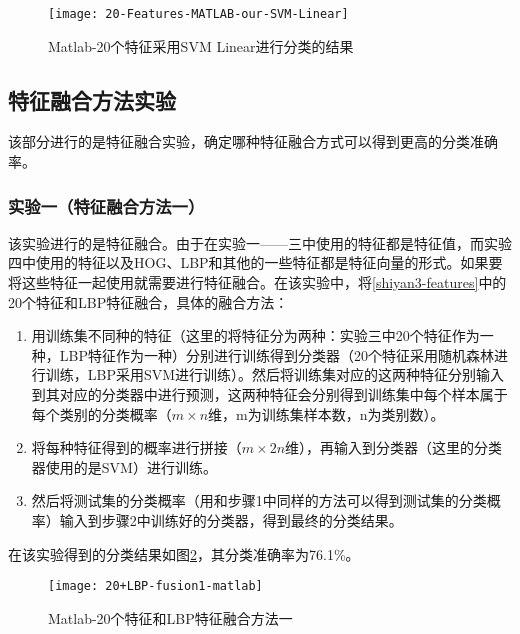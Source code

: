 \begin{figure}[!ht]
\centering
\texttt{[image: 20-Features-MATLAB-our-SVM-Linear]}
\caption{Matlab-20个特征采用SVM Linear进行分类的结果}
\label{fig:20-Features-MATLAB-our-SVM-Linear}
\end{figure}


\subsection{特征融合方法实验}
该部分进行的是特征融合实验，确定哪种特征融合方式可以得到更高的分类准确率。

\subsubsection{实验一（特征融合方法一）}
\label{ronghe1}
该实验进行的是特征融合。由于在实验一——三中使用的特征都是特征值，而实验四中使用的特征以及HOG、LBP和其他的一些特征都是特征向量的形式。如果要将这些特征一起使用就需要进行特征融合。在该实验中，将\ref{shiyan3-features}中的20个特征和LBP特征融合，具体的融合方法：
\begin{enumerate}
\item 用训练集不同种的特征（这里的将特征分为两种：实验三中20个特征作为一种，LBP特征作为一种）分别进行训练得到分类器（20个特征采用随机森林进行训练，LBP采用SVM进行训练）。然后将训练集对应的这两种特征分别输入到其对应的分类器中进行预测，这两种特征会分别得到训练集中每个样本属于每个类别的分类概率（$m \times n$维，m为训练集样本数，n为类别数）。
\item 将每种特征得到的概率进行拼接（$m \times 2n$维），再输入到分类器（这里的分类器使用的是SVM）进行训练。
\item 然后将测试集的分类概率（用和步骤1中同样的方法可以得到测试集的分类概率）输入到步骤2中训练好的分类器，得到最终的分类结果。
\end{enumerate}

在该实验得到的分类结果如图\ref{fig:20+LBP-fusion1-matlab}，其分类准确率为76.1\%。
\begin{figure}[!ht]
\centering
\texttt{[image: 20+LBP-fusion1-matlab]}
\caption{Matlab-20个特征和LBP特征融合方法一}
\label{fig:20+LBP-fusion1-matlab}
\end{figure}

